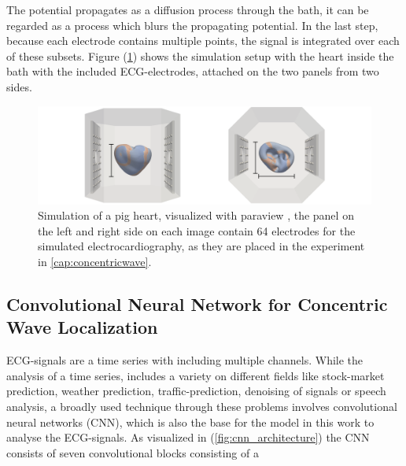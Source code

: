 The potential propagates as a diffusion process through the bath, it can be regarded as a process which blurs the propagating potential. In the last step, because each electrode contains multiple points, the signal is integrated over each of these subsets. Figure (\ref{fig:pig_heart_in_bath}) shows the simulation setup with the heart inside the bath with the included ECG-electrodes, attached on the two panels from two sides.

\begin{figure}[ht]
    \center
    \hspace*{-2.45cm} 
    \includegraphics[width=1.4\textwidth]{figures/simulation_setup.png}
	\caption{Simulation of a pig heart, visualized with paraview \cite{paraview}, the panel on the left and right side on each image contain 64 electrodes for the simulated electrocardiography, as they are placed in the experiment in \ref{cap:concentricwave}.}
	\label{fig:pig_heart_in_bath}
\end{figure}



\subsection{Convolutional Neural Network for Concentric Wave Localization}
\label{convnet}
ECG-signals are a time series with including multiple channels. While the analysis of a time series, includes a variety on different fields like stock-market prediction, weather prediction, traffic-prediction, denoising of signals or speech analysis, a broadly used technique through these problems involves convolutional neural networks (CNN), which is also the base for the model in this work to analyse the ECG-signals. 
As visualized in (\ref{fig:cnn_architecture}) the CNN consists of seven convolutional blocks consisting of a

